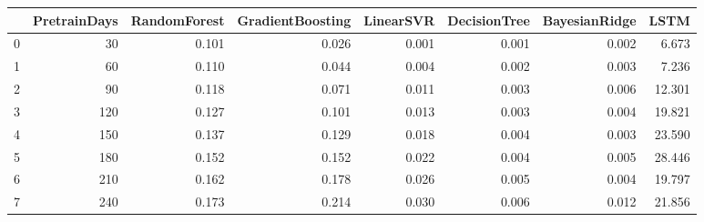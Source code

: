 \begin{tabular}{lrrrrrrr}
\toprule
{} &  PretrainDays &  RandomForest &  GradientBoosting &  LinearSVR &  DecisionTree &  BayesianRidge &   LSTM \\
\midrule
0 &            30 &         0.101 &             0.026 &      0.001 &         0.001 &          0.002 &  6.673 \\
1 &            60 &         0.110 &             0.044 &      0.004 &         0.002 &          0.003 &  7.236 \\
2 &            90 &         0.118 &             0.071 &      0.011 &         0.003 &          0.006 & 12.301 \\
3 &           120 &         0.127 &             0.101 &      0.013 &         0.003 &          0.004 & 19.821 \\
4 &           150 &         0.137 &             0.129 &      0.018 &         0.004 &          0.003 & 23.590 \\
5 &           180 &         0.152 &             0.152 &      0.022 &         0.004 &          0.005 & 28.446 \\
6 &           210 &         0.162 &             0.178 &      0.026 &         0.005 &          0.004 & 19.797 \\
7 &           240 &         0.173 &             0.214 &      0.030 &         0.006 &          0.012 & 21.856 \\
\bottomrule
\end{tabular}
